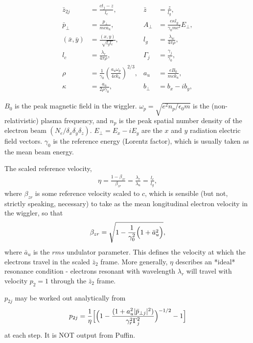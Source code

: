 \documentclass[12pt]{article}%
\begin{document}
\begin{align}
\bar{z}_{2j} &= \frac{ct_j - z}{l_c}, &\bar{z} &= \frac{z}{l_g}, \nonumber \\
\bar{p}_{\bot} &= \frac{p_{\bot}}{mc a_u},
&A_{\bot}&=\frac{e \kappa l_g}{\gamma_0 mc^2 }E_{\bot}, \nonumber \\
(\bar{x},\bar{y}) &= \frac{(x,y)}{\sqrt{l_g l_c}}, &l_g &= \frac{\lambda_w}{4\pi\rho}, \nonumber \\
l_c &= \frac{\lambda_r}{4\pi\rho}, & \Gamma_j& = \frac{\gamma_j}{\gamma_0}, \nonumber \\
\rho &=\frac{1}{\gamma_0}\left(\frac{a_u \omega_p}{4ck_u}\right)^{2/3},
&a_u & =\frac{eB_0}{mck_u}, \nonumber \\
\kappa & = \frac{a_u}{2 \rho \gamma_0}, & b_{\bot} & = b_x - i b_y, \nonumber
\end{align}

$B_0$ is the peak magnetic field in the wiggler.
$\omega_p = \sqrt{e^2 n_p / \epsilon_0 m}$ is the (non-relativistic) plasma frequency, and $n_p$ is the peak spatial number density of the electron beam $(N_e / \delta_x \delta_y \delta_z)$.
$E_\bot = E_x - i E_y$ are the $x$ and $y$ radiation electric field vectors. $\gamma_0$ is the reference energy (Lorentz factor), which is usually taken as the mean beam energy.

The scaled reference velocity,
\begin{align}
\eta = \frac{1 - \beta_{zr}}{\beta_{zr}} = \frac{\lambda_r}{\lambda_u} = \frac{l_c}{l_g},
\end{align}
where $\beta_{zr}$ is some reference velocity scaled to $c$, which is sensible (but not, strictly speaking, necessary) to take as the mean longitudinal electron velocity in the wiggler, so that
\begin{align}
\beta_{zr} = \sqrt{ 1 - \frac{1}{\gamma_0^2}\Bigl(1 + \bar{a}_u^2\Bigr)},
\end{align}
where $\bar{a}_u$ is the $rms$ undulator parameter.
This defines the velocity at which the electrons travel in the scaled $\bar{z}_2$ frame. More generally, $\eta$ describes an *ideal* resonance condition - electrons resonant with wavelength $\lambda_r$ will travel with velocity $p_2=1$ through the $\bar{z}_2$ frame.




$p_{2j}$ may be worked out analytically from
\begin{align}
p_{2j} = \frac{1}{\eta}\Bigl[ \Bigl(  1 - \frac{(1 + a_u^2 | \bar{p}_{\bot j} |^2)}{\gamma_r^2 \Gamma^2_j}  \Bigr)^{-1/2} - 1   \Bigr]
\end{align}
at each step. It is NOT output from Puffin.
\end{document}
